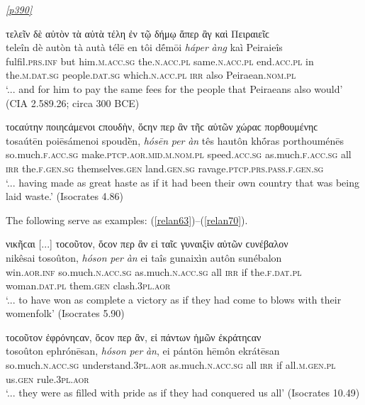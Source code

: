 \hyperlink{p390}{\emph{[p390]}}

\begin{exe}
\ex τελεῖν δὲ αὐτὸν τὰ αὐτὰ τέλη ἐν τῷ δήμῳ ἅπερ ἂγ καὶ Πειραιεῖϲ\\
\gll teleîn dè autòn tà autà télē en tôi dḗmōi \emph{háper} \emph{àng} kaì Peiraieîs\\
fulfil.\textsc{prs.inf} but him.\textsc{m.acc.sg} the.\textsc{n.acc.pl} same.\textsc{n.acc.pl} end.\textsc{acc.pl} in the.\textsc{m.dat.sg} people.\textsc{dat.sg} which.\textsc{n.acc.pl} \textsc{irr} also Peiraean.\textsc{nom.pl}\\
\trans `... and for him to pay the same fees for the people that Peiraeans also would' (CIA 2.589.26; circa 300 BCE)
\label{relan62}
\end{exe}

\begin{exe}
\ex τοϲαύτην ποιηϲάμενοι ϲπουδὴν, ὅϲην περ ἂν τῆϲ αὑτῶν χώραϲ πορθουμένηϲ\\
\gll tosaútēn poiēsámenoi spoudḕn, \emph{hósēn} \emph{per} \emph{àn} tês hautôn khṓras porthouménēs\\
so.much.\textsc{f.acc.sg} make.\textsc{ptcp.aor.mid.m.nom.pl} speed.\textsc{acc.sg} as.much.\textsc{f.acc.sg} all \textsc{irr} the.\textsc{f.gen.sg} themselves.\textsc{gen} land.\textsc{gen.sg} ravage.\textsc{ptcp.prs.pass.f.gen.sg}\\
\trans `... having made as great haste as if it had been their own country that was being laid waste.' (Isocrates 4.86)
\label{relan63}
\end{exe}

The following serve as examples: (\ref{relan63})--(\ref{relan70}).

\begin{exe}
\ex νικῆϲαι {[}...{]} τοϲοῦτον, ὅϲον περ ἂν εἰ ταῖϲ γυναιξὶν αὐτῶν ϲυνέβαλον\\
\gll nikêsai tosoûton, \emph{hóson} \emph{per} \emph{àn} ei taîs gunaixìn autôn sunébalon\\
win.\textsc{aor.inf} so.much.\textsc{n.acc.sg} as.much.\textsc{n.acc.sg} all \textsc{irr} if the.\textsc{f.dat.pl} woman.\textsc{dat.pl} them.\textsc{gen} clash.\textsc{3pl.aor}\\
\trans `... to have won as complete a victory as if they had come to blows with their womenfolk' (Isocrates 5.90)
\label{relan64}
\end{exe}

\begin{exe}
\ex τοϲοῦτον ἐφρόνηϲαν, ὅϲον περ ἂν, εἰ πάντων ἡμῶν ἐκράτηϲαν\\
\gll tosoûton ephrónēsan, \emph{hóson} \emph{per} \emph{àn}, ei pántōn hēmôn ekrátēsan\\
so.much.\textsc{n.acc.sg} understand.\textsc{3pl.aor} as.much.\textsc{n.acc.sg} all \textsc{irr} if all.\textsc{m.gen.pl} us.\textsc{gen} rule.\textsc{3pl.aor}\\
\trans `... they were as filled with pride as if they had conquered us all' (Isocrates 10.49)
\label{relan65}
\end{exe}

